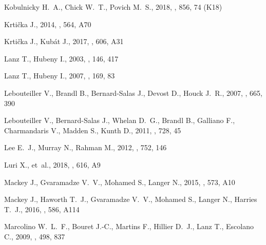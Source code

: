 \documentclass[useAMS, usenatbib, a4paper]{mnras}
\begin{document}
\begin{thebibliography}{}
{Kobulnicky} H.~A.,  {Chick} W.~T.,   {Povich} M.~S.,  2018, \apj, 856, 74
  (K18)

{Krti{\v c}ka} J.,  2014, \aap, 564, A70

{Krtička} J.,  {Kubát} J.,  2017, \aap, 606, A31

{Lanz} T.,  {Hubeny} I.,  2003, \apjs, 146, 417

{Lanz} T.,  {Hubeny} I.,  2007, \apjs, 169, 83

{Lebouteiller} V.,  {Brandl} B.,  {Bernard-Salas} J.,  {Devost} D.,   {Houck}
  J.~R.,  2007, \apj, 665, 390

{Lebouteiller} V.,  {Bernard-Salas} J.,  {Whelan} D.~G.,  {Brandl} B.,
  {Galliano} F.,  {Charmandaris} V.,  {Madden} S.,   {Kunth} D.,  2011, \apj,
  728, 45

{Lee} E.~J.,  {Murray} N.,   {Rahman} M.,  2012, \apj, 752, 146

{Luri} X.,  et~al., 2018, \aap, 616, A9

{Mackey} J.,  {Gvaramadze} V.~V.,  {Mohamed} S.,   {Langer} N.,  2015, \aap,
  573, A10

{Mackey} J.,  {Haworth} T.~J.,  {Gvaramadze} V.~V.,  {Mohamed} S.,  {Langer}
  N.,   {Harries} T.~J.,  2016, \aap, 586, A114

{Marcolino} W.~L.~F.,  {Bouret} J.-C.,  {Martins} F.,  {Hillier} D.~J.,  {Lanz}
  T.,   {Escolano} C.,  2009, \aap, 498, 837


\end{thebibliography}
\end{document}
